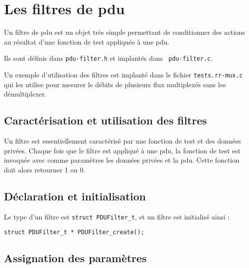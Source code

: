 %
\section{Les filtres de {\sc pdu}}
\label{section:filtres}

   Un filtre de  {\sc pdu} est un objet très simple permettant de
conditionner des actions au résultat d'une fonction de test appliquée
à une {\sc pdu}.

   Ils sont définis dans {\tt pdu-filter.h} et implantés dans {\tt
pdu-filter.c}. 

   Un exemple d'utilisation des filtres est implanté dans le fichier
{\tt tests.rr-mux.c} qui les utilise pour mesurer le débits de
plusieurs flux multiplexés sans les démultiplexer.

%
\subsection{Caractérisation et utilisation des filtres}

   Un filtre est essentiellement caractérisé par une fonction de test
et des données privées. Chaque fois que le filtre est appliqué à une
{\sc   pdu}, la fonction de test est invoquée avec comme paramètres
les données privées et la {\sc pdu}. Cette fonction doit alors
retourner 1  ou 0.

%
\subsection{Déclaration et initialisation}

   Le type d'un filtre est {\tt struct PDUFilter\_t}, et un filtre est
initialisé ainsi :

\begin{verbatim}
struct PDUFilter_t * PDUFilter_create();
\end{verbatim}

%
\subsection{Assignation des paramètres}

